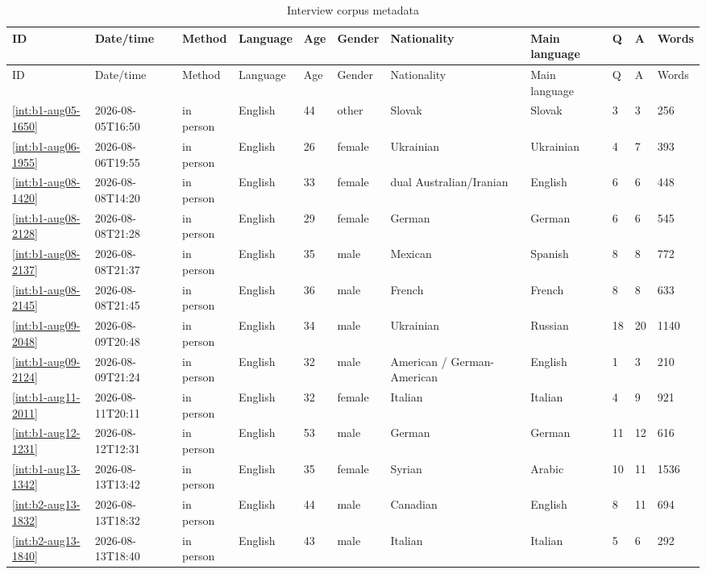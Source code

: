 \begin{landscape}
\begin{longtable}{@{}p{2.2cm}p{2.0cm}p{1.6cm}p{1.4cm}p{0.8cm}p{1.3cm}p{2.4cm}p{1.8cm}p{0.6cm}p{0.6cm}p{1.0cm}@{}}
\caption{Interview corpus metadata}\label{tab:interview_corpus} \\
\toprule
ID & Date/time & Method & Language & Age & Gender & Nationality & Main language & Q & A & Words \\
\midrule
\endfirsthead
\toprule
ID & Date/time & Method & Language & Age & Gender & Nationality & Main language & Q & A & Words \\
\midrule
\endhead
\bottomrule
\endfoot
\ref{int:b1-aug05-1650} & 2026-08-05T16:50 & in person & English & 44 & other & Slovak & Slovak & 3 & 3 & 256 \\
\ref{int:b1-aug06-1955} & 2026-08-06T19:55 & in person & English & 26 & female & Ukrainian & Ukrainian & 4 & 7 & 393 \\
\ref{int:b1-aug08-1420} & 2026-08-08T14:20 & in person & English & 33 & female & dual Australian/Iranian & English & 6 & 6 & 448 \\
\ref{int:b1-aug08-2128} & 2026-08-08T21:28 & in person & English & 29 & female & German & German & 6 & 6 & 545 \\
\ref{int:b1-aug08-2137} & 2026-08-08T21:37 & in person & English & 35 & male & Mexican & Spanish & 8 & 8 & 772 \\
\ref{int:b1-aug08-2145} & 2026-08-08T21:45 & in person & English & 36 & male & French & French & 8 & 8 & 633 \\
\ref{int:b1-aug09-2048} & 2026-08-09T20:48 & in person & English & 34 & male & Ukrainian & Russian & 18 & 20 & 1140 \\
\ref{int:b1-aug09-2124} & 2026-08-09T21:24 & in person & English & 32 & male & American / German-American & English & 1 & 3 & 210 \\
\ref{int:b1-aug11-2011} & 2026-08-11T20:11 & in person & English & 32 & female & Italian & Italian & 4 & 9 & 921 \\
\ref{int:b1-aug12-1231} & 2026-08-12T12:31 & in person & English & 53 & male & German & German & 11 & 12 & 616 \\
\ref{int:b1-aug13-1342} & 2026-08-13T13:42 & in person & English & 35 & female & Syrian & Arabic & 10 & 11 & 1536 \\
\ref{int:b2-aug13-1832} & 2026-08-13T18:32 & in person & English & 44 & male & Canadian & English & 8 & 11 & 694 \\
\ref{int:b2-aug13-1840} & 2026-08-13T18:40 & in person & English & 43 & male & Italian & Italian & 5 & 6 & 292 \\

\end{longtable}
\end{landscape}
